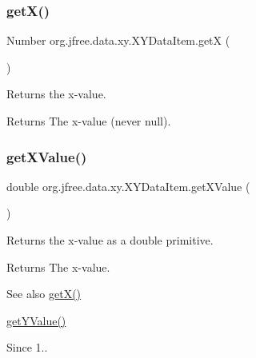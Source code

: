 \subsubsection{\texorpdfstring{get\+X()}{getX()}}
{\footnotesize\ttfamily Number org.\+jfree.\+data.\+xy.\+X\+Y\+Data\+Item.\+getX (\begin{DoxyParamCaption}{ }\end{DoxyParamCaption})}

Returns the x-\/value.

\begin{DoxyReturn}{Returns}
The x-\/value (never {\ttfamily null}). 
\end{DoxyReturn}
\mbox{\label{classorg_1_1jfree_1_1data_1_1xy_1_1_x_y_data_item_ae6fd536f9d38c38fbb2867c22820895b}} 
\subsubsection{\texorpdfstring{get\+X\+Value()}{getXValue()}}
{\footnotesize\ttfamily double org.\+jfree.\+data.\+xy.\+X\+Y\+Data\+Item.\+get\+X\+Value (\begin{DoxyParamCaption}{ }\end{DoxyParamCaption})}

Returns the x-\/value as a double primitive.

\begin{DoxyReturn}{Returns}
The x-\/value.
\end{DoxyReturn}
\begin{DoxySeeAlso}{See also}
\mbox{\hyperlink{classorg_1_1jfree_1_1data_1_1xy_1_1_x_y_data_item_a54ac12b01a4653c319cc72c1617ae290}{get\+X()}} 

\mbox{\hyperlink{classorg_1_1jfree_1_1data_1_1xy_1_1_x_y_data_item_a0aa8d9e18739e51a4401f673eedd91c6}{get\+Y\+Value()}}
\end{DoxySeeAlso}
\begin{DoxySince}{Since}
1.. 
\end{DoxySince}
\mbox{\label{classorg_1_1jfree_1_1data_1_1xy_1_1_x_y_data_item_a7b2d50b0cf1b16b806854e2fb74c25d9}} 
